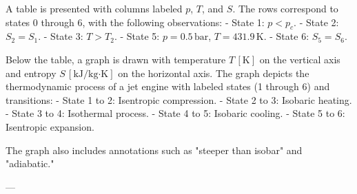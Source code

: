 A table is presented with columns labeled \( p \), \( T \), and \( S \). The rows correspond to states 0 through 6, with the following observations:  
- State 1: \( p < p_c \).  
- State 2: \( S_2 = S_1 \).  
- State 3: \( T > T_2 \).  
- State 5: \( p = 0.5 \, \text{bar} \), \( T = 431.9 \, \text{K} \).  
- State 6: \( S_5 = S_6 \).  

Below the table, a graph is drawn with temperature \( T \, [\text{K}] \) on the vertical axis and entropy \( S \, [\text{kJ/kg·K}] \) on the horizontal axis. The graph depicts the thermodynamic process of a jet engine with labeled states (1 through 6) and transitions:  
- State 1 to 2: Isentropic compression.  
- State 2 to 3: Isobaric heating.  
- State 3 to 4: Isothermal process.  
- State 4 to 5: Isobaric cooling.  
- State 5 to 6: Isentropic expansion.  

The graph also includes annotations such as "steeper than isobar" and "adiabatic."  

---